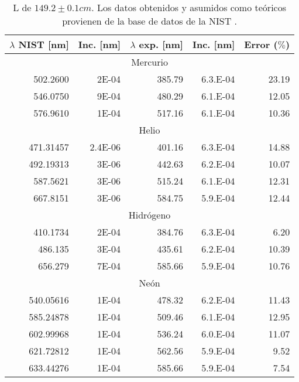 \documentclass[%
 reprint,
 amsmath,amssymb,
 aps,
]{revtex4-1}
\begin{document}
\begin{table}[H]
  \centering
  \caption{L de $149.2 \pm 0.1 cm$. Los datos obtenidos y asumidos como teóricos provienen de la base de datos de la NIST \cite{NIST}.}
    \begin{tabular}{|r|r|r|r|r|}
    \hline
    \multicolumn{1}{|l}{$\lambda$ NIST [nm]} & \multicolumn{1}{|l}{Inc. [nm]} & \multicolumn{1}{|l}{$\lambda$ exp. [nm]} & \multicolumn{1}{|l}{Inc. [nm]} & \multicolumn{1}{|l|}{Error ($\%$)} \\
    \hline
    \multicolumn{5}{|c|}{Mercurio} \\
    \hline
    502.2600 & 2E-04 & 385.79 & 6.3.E-04 & 23.19 \\
    546.0750 & 9E-04 & 480.29 & 6.1.E-04 & 12.05 \\
    576.9610 & 1E-04 & 517.16 & 6.1.E-04 & 10.36 \\
    \hline
    \multicolumn{5}{|c|}{Helio} \\
    \hline
    471.31457 & 2.4E-06 & 401.16 & 6.3.E-04 & 14.88 \\
    492.19313 & 3E-06 & 442.63 & 6.2.E-04 & 10.07 \\
    587.5621 & 3E-06 & 515.24 & 6.1.E-04 & 12.31 \\
    667.8151 & 3E-06 & 584.75 & 5.9.E-04 & 12.44 \\
    \hline
    \multicolumn{5}{|c|}{Hidrógeno} \\
    \hline
    410.1734 & 2E-04 & 384.76 & 6.3.E-04 & 6.20 \\
    486.135 & 3E-04 & 435.61 & 6.2.E-04 & 10.39 \\
    656.279 & 7E-04 & 585.66 & 5.9.E-04 & 10.76 \\
    \hline
    \multicolumn{5}{|c|}{Neón} \\
    \hline
    540.05616 & 1E-04 & 478.32 & 6.2.E-04 & 11.43 \\
    585.24878 & 1E-04 & 509.46 & 6.1.E-04 & 12.95 \\
    602.99968 & 1E-04 & 536.24 & 6.0.E-04 & 11.07 \\
    621.72812 & 1E-04 & 562.56 & 5.9.E-04 & 9.52 \\
    633.44276 & 1E-04 & 585.66 & 5.9.E-04 & 7.54 \\
    \hline
    \end{tabular}%
  \label{tab:149}%
\end{table}%
\end{document}
